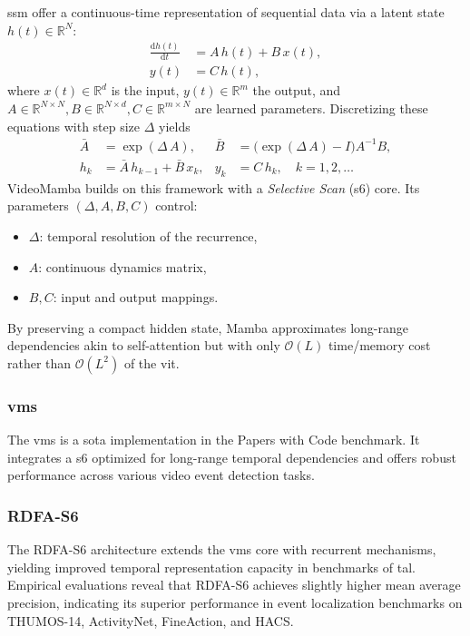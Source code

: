 \acrfull{ssm} offer a continuous-time representation of sequential data via a latent state \(h(t)\in\mathbb{R}^N\):
\begin{align}
    \frac{\mathrm{d}h(t)}{\mathrm{d}t} &= A\,h(t) + B\,x(t),  \label{eq:ssm_continuous1}\\
    y(t) &= C\,h(t),                                    \label{eq:ssm_continuous2}
\end{align}
where \(x(t)\in\mathbb{R}^d\) is the input, \(y(t)\in\mathbb{R}^m\) the output, and \(A\in\mathbb{R}^{N\times N}, B\in\mathbb{R}^{N\times d}, C\in\mathbb{R}^{m\times N}\) are learned parameters.  Discretizing these equations with step size \(\Delta\) yields
\begin{align}
    \bar A &= \exp(\Delta\,A), 
    & 
    \bar B &= \bigl(\exp(\Delta\,A)-I\bigr)A^{-1}B,\\
    h_k &= \bar A\,h_{k-1} + \bar B\,x_k, 
    &
    y_k &= C\,h_k,
    \quad k=1,2,\dots
\end{align}
VideoMamba \cite{li_videomamba_2024} builds on this framework with a \emph{Selective Scan} (\acrshort{s6}) core. Its parameters \((\Delta, A,B,C)\) control:
\begin{itemize}
    \item \(\Delta\): temporal resolution of the recurrence,
    \item \(A\): continuous dynamics matrix,
    \item \(B,C\): input and output mappings.
\end{itemize}

By preserving a compact hidden state, Mamba approximates long-range dependencies akin to self-attention but with only \(\mathcal{O}(L)\) time/memory cost rather than \(\mathcal{O}(L^2)\) of the \acrlong{vit}.  

\subsubsection{\acrfull{vms}}
The \acrfull{vms} is a \acrfull{sota} implementation in the Papers with Code benchmark. It integrates a \acrlong{s6} optimized for long-range temporal dependencies and offers robust performance across various video event detection tasks. 

\subsubsection{RDFA-S6}
The RDFA-S6 architecture extends the \acrshort{vms} core with recurrent mechanisms, yielding improved temporal representation capacity in benchmarks of \acrfull{tal}. Empirical evaluations reveal that RDFA-S6 achieves slightly higher mean average precision, indicating its superior performance in event localization benchmarks on THUMOS-14, ActivityNet, FineAction, and HACS.

